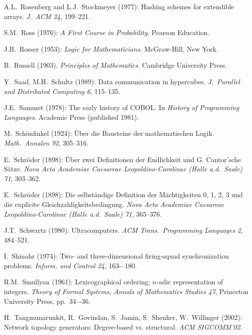 \begin{thebibliography}{999}
A.L.~Rosenberg and L.J.~Stockmeyer (1977): Hashing schemes for
extendible arrays.  {\it J.~ACM 24}, 199--221.

S.M.~Ross (1976):
{\it A First Course in Probability}.
Pearson Education.

J.B.~Rosser (1953):
{\it Logic for Mathematicians.}
McGraw-Hill, New York.

B.~Russell (1903).  {\it Principles of Mathematics}.
Cambridge University Press. 



Y.~Saad, M.H.~Schultz (1989):
Data communication in hypercubes.
{\it J.~Parallel and Distributed Computing 6}, 115--135.


J.E.~Sammet (1978):
The early history of COBOL.  In {\it History of Programming
  Languages}.  Academic Press (published 1981).

M.~Sch\"onfinkel (1924): \"{U}ber die Bausteine der mathematischen
Logik.  {\it Math.~Annalen 92}, 305--316.

E.~Schr\"{o}der (1898): \"{U}ber zwei Definitionen der Endlichkeit und
G. Cantor'sche S\"{a}tze.  {\it Nova Acta Academiae Caesareae
Leopoldino-Carolinae (Halle a.d.~Saale) 71}, 303--362.

E.~Schr\"{o}der (1898): Die selbst\"{a}ndige Definition der
M\"{a}chtigkeiten 0, 1, 2, 3 und die explicite
Gleichzahligkeitsbedingung.  {\it Nova Acta Academiae Caesareae
Leopoldino-Carolinae (Halle a.d.~Saale) 71}, 365--376.

J.T.~Schwartz (1980):
Ultracomputers.
{\it ACM Trans.~Programming Languages 2}, 484--521.

I.~Shinahr (1974): Two- and three-dimensional firing-squad
synchronization problems.  {\it Inform. and Control 24}, 163-–180.

R.M.~Smullyan (1961):  Lexicographical ordering; $n$-adic
representation of integers.  
{\it Theory of Formal Systems, Annals of Mathematics Studies 47},
Princeton University Press, pp.~34–-36.


H.~Tangmunarunkit, R.~Govindan, S.~Jamin, S.~Shenker, W.~Willinger (2002):
Network topology generators: Degree-based vs.
structural.  {\it ACM SIGCOMM'02}.


\end{thebibliography}

